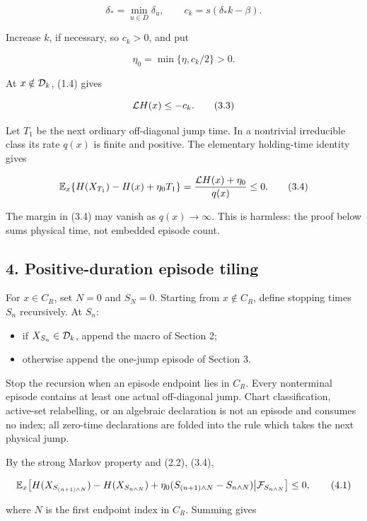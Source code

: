 \[
        \delta_*=\min_{u\in D}\delta_u,\qquad
        c_k=s(\delta_*k-\beta).                         \tag{3.1}
\]

Increase \(k\), if necessary, so \(c_k>0\), and put

\[
                       \eta_0=\min\{\eta,c_k/2\}>0.    \tag{3.2}
\]

At \(x\notin{\cal D}_k\), (1.4) gives

\[
                         {\cal L}H(x)\le-c_k.          \tag{3.3}
\]

Let \(T_1\) be the next ordinary off-diagonal jump time. In a nontrivial
irreducible class its rate \(q(x)\) is finite and positive. The
elementary holding-time identity gives

\[
 {\mathbb E}_x\{H(X_{T_1})-H(x)+\eta_0T_1\}
 ={ {\cal L}H(x)+\eta_0\over q(x)}\le0.                \tag{3.4}
\]

The margin in (3.4) may vanish as \(q(x)\to\infty\). This is harmless:
the proof below sums physical time, not embedded episode count.

\subsection{4. Positive-duration episode
tiling}

For \(x\in C_R\), set \(N=0\) and \(S_N=0\). Starting from
\(x\notin C_R\), define stopping times \(S_n\) recursively. At \(S_n\):

\begin{itemize}
\tightlist
\item
  if \(X_{S_n}\in{\cal D}_k\), append the macro of Section 2;
\item
  otherwise append the one-jump episode of Section 3.
\end{itemize}

Stop the recursion when an episode endpoint lies in \(C_R\). Every
nonterminal episode contains at least one actual off-diagonal jump.
Chart classification, active-set relabelling, or an algebraic
declaration is not an episode and consumes no index; all zero-time
declarations are folded into the rule which takes the next physical
jump.

By the strong Markov property and (2.2), (3.4),

\[
 {\mathbb E}_x\!\left[
 H(X_{S_{(n+1)\wedge N}})-H(X_{S_{n\wedge N}})
 +\eta_0(S_{(n+1)\wedge N}-S_{n\wedge N})
 \middle|{\cal F}_{S_{n\wedge N}}\right]\le0,          \tag{4.1}
\]

where \(N\) is the first endpoint index in \(C_R\). Summing gives

